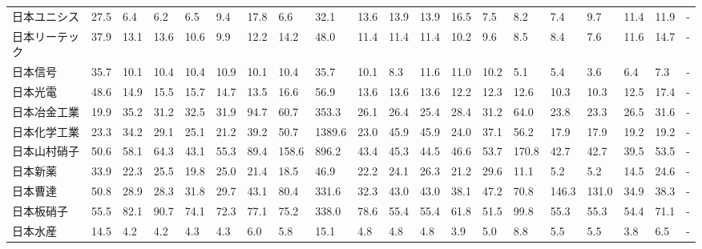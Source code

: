 \begin{longtable}[c]{lp{3mm}p{3mm}p{3mm}p{3mm}p{3mm}p{3mm}p{3mm}p{3mm}p{3mm}p{3mm}p{3mm}p{3mm}p{3mm}p{3mm}p{3mm}p{3mm}p{3mm}p{3mm}p{3mm}}
日本ユニシス          &   27.5 &    6.4 &       6.2 &       6.5 &        9.4 &    17.8 &     6.6 &     32.1 &    13.6 &    13.9 &   13.9 &   16.5 &     7.5 &     8.2 &     7.4 &    9.7 &   11.4 &    11.9 &      - \\
日本リーテック         &   37.9 &   13.1 &      13.6 &      10.6 &        9.9 &    12.2 &    14.2 &     48.0 &    11.4 &    11.4 &   11.4 &   10.2 &     9.6 &     8.5 &     8.4 &    7.6 &   11.6 &    14.7 &      - \\
日本信号            &   35.7 &   10.1 &      10.4 &      10.4 &       10.9 &    10.1 &    10.4 &     35.7 &    10.1 &     8.3 &   11.6 &   11.0 &    10.2 &     5.1 &     5.4 &    3.6 &    6.4 &     7.3 &      - \\
日本光電            &   48.6 &   14.9 &      15.5 &      15.7 &       14.7 &    13.5 &    16.6 &     56.9 &    13.6 &    13.6 &   13.6 &   12.2 &    12.3 &    12.6 &    10.3 &   10.3 &   12.5 &    17.4 &      - \\
日本冶金工業          &   19.9 &   35.2 &      31.2 &      32.5 &       31.9 &    94.7 &    60.7 &    353.3 &    26.1 &    26.4 &   25.4 &   28.4 &    31.2 &    64.0 &    23.8 &   23.3 &   26.5 &    31.6 &      - \\
日本化学工業          &   23.3 &   34.2 &      29.1 &      25.1 &       21.2 &    39.2 &    50.7 &   1389.6 &    23.0 &    45.9 &   45.9 &   24.0 &    37.1 &    56.2 &    17.9 &   17.9 &   19.2 &    19.2 &      - \\
日本山村硝子          &   50.6 &   58.1 &      64.3 &      43.1 &       55.3 &    89.4 &   158.6 &    896.2 &    43.4 &    45.3 &   44.5 &   46.6 &    53.7 &   170.8 &    42.7 &   42.7 &   39.5 &    53.5 &      - \\
日本新薬            &   33.9 &   22.3 &      25.5 &      19.8 &       25.0 &    21.4 &    18.5 &     46.9 &    22.2 &    24.1 &   26.3 &   21.2 &    29.6 &    11.1 &     5.2 &    5.2 &   14.5 &    24.6 &      - \\
日本曹達            &   50.8 &   28.9 &      28.3 &      31.8 &       29.7 &    43.1 &    80.4 &    331.6 &    32.3 &    43.0 &   43.0 &   38.1 &    47.2 &    70.8 &   146.3 &  131.0 &   34.9 &    38.3 &      - \\
日本板硝子           &   55.5 &   82.1 &      90.7 &      74.1 &       72.3 &    77.1 &    75.2 &    338.0 &    78.6 &    55.4 &   55.4 &   61.8 &    51.5 &    99.8 &    55.3 &   55.3 &   54.4 &    71.1 &      - \\
日本水産            &   14.5 &    4.2 &       4.2 &       4.3 &        4.3 &     6.0 &     5.8 &     15.1 &     4.8 &     4.8 &    4.8 &    3.9 &     5.0 &     8.8 &     5.5 &    5.5 &    3.8 &     6.5 &      - \\

\end{longtable}
